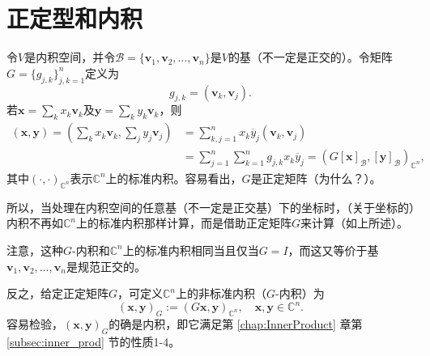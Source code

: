 \section{正定型和内积}

令$V$是内积空间，并令${\mathcal{B}}=\{\mathbf{v}_{1},\mathbf{v}_{2},\ldots,\mathbf{v}_{n}\}$是$V$的基（不一定是正交的）。令矩阵$G=\{g_{j,k}\}_{j,k=1}^n$定义为
\[g_{j,k}=(\mathbf{v}_k,\mathbf{v}_j).\]
若$\mathbf{x}=\sum_{k}x_{k}\mathbf{v}_{k}$及$\mathbf{y}=\sum_{k}y_{k}\mathbf{v}_{k}$，则
\[\begin{aligned}
  (\mathbf{x},\mathbf{y})=\left(\sum_{k}x_{k}\mathbf{v}_{k},\sum_{j}y_{j}\mathbf{v}_{j}\right)&=\sum_{k,j=1}^{n}x_{k}\overline{y}_{j}(\mathbf{v}_{k},\mathbf{v}_{j})\\&=\sum_{j=1}^{n}\sum_{k=1}^{n}g_{j,k}x_{k}\overline{y}_{j}=(G[\mathbf{x}]_{\mathcal{B}},[\mathbf{y}]_{\mathcal{B}})_{\mathbb{C}^{n}},
\end{aligned}\]
其中$(\cdot,\cdot)_{\mathbb{C}^n}$表示$\mathbb{C}^n$上的标准内积。容易看出，$G$是正定矩阵（为什么？）。

所以，当处理在内积空间的任意基（不一定是正交基）下的坐标时，（关于坐标的）内积不再如$\mathbb{C}^n$上的标准内积那样计算，而是借助正定矩阵$G$来计算（如上所述）。

注意，这种$G$-内积和$\mathbb{C}^n$上的标准内积相同当且仅当$G=I$，而这又等价于基$\mathbf{v}_{1},\mathbf{v}_{2},\ldots,\mathbf{v}_{n}$是规范正交的。

反之，给定正定矩阵$G$，可定义$\mathbb{C}^n$上的非标准内积（$G$-内积）为
\[(\mathbf{x},\mathbf{y})_G:=(G\mathbf{x},\mathbf{y})_{\mathbb{C}^n},\quad\mathbf{x},\mathbf{y}\in\mathbb{C}^n.\]
容易检验，$(\mathbf{x},\mathbf{y})_G$的确是内积，即它满足第 \ref{chap:InnerProduct} 章第 \ref{subsec:inner_prod} 节的性质1-4。